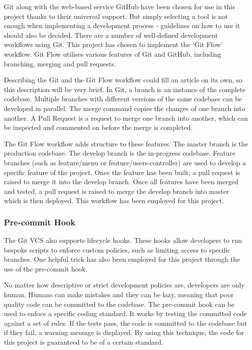       Git along with the web-based service GitHub have been chosen for use in this project thanks to their universal support. But simply selecting a tool is not enough when implementing a development process - guidelines on how to use it should also be decided. There are a number of well-defined development workflows using Git. This project has chosen to implement the `Git Flow' workflow. Git Flow utilises various features of Git and GitHub, including branching, merging and pull requests. 

      Describing the Git and the Git Flow workflow could fill an article on its own, so this description will be very brief. In Git, a branch is an instance of the complete codebase. Multiple branches with different versions of the same codebase can be developed in parallel. The merge command copies the changes of one branch into another. A Pull Request is a request to merge one branch into another, which can be inspected and commented on before the merge is completed.

      The Git Flow workflow adds structure to these features. The master branch is the production codebase. The develop branch is the in-progress codebase. Feature branches (such as feature/menu or feature/users-controller) are used to develop a specific feature of the project. Once the feature has been built, a pull request is raised to merge it into the develop branch. Once all features have been merged and tested, a pull request is raised to merge the develop branch into master which is then deployed. This workflow has been employed for this project.

      \subsubsection{Pre-commit Hook}
        The Git VCS also supports lifecycle hooks. These hooks allow developers to run bespoke scripts to enforce custom policies, such as limiting access to specific branches. One helpful trick has also been employed for this project through the use of the pre-commit hook.

        No matter how descriptive or strict development policies are, developers are only human. Humans can make mistakes and they can be lazy, meaning that poor quality code can be committed to the codebase. The pre-commit hook can be used to enfoce a specific coding standard. It works by testing the committed code against a set of rules. If the tests pass, the code is committed to the codebase but if they fail, a warning message is displayed. By using this technique, the code for this project is guaranteed to be of a certain standard.


